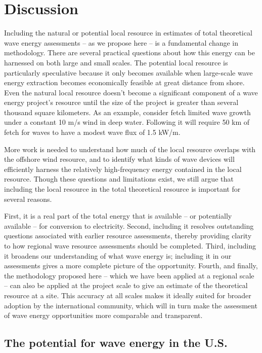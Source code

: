 \section{Discussion} \label{sec:discussion}

Including the natural or potential local resource in estimates of total theoretical wave energy assessments -- as we propose here -- is a fundamental change in methodology. There are several practical questions about how this energy can be harnessed on both large and small scales. 
The potential local resource is particularly speculative because it only becomes available when large-scale wave energy extraction becomes economically feasible at great distance from shore. Even the natural local resource doesn't become a significant component of a wave energy project's resource until the size of the project is greater than several thousand square kilometers. As an example, consider fetch limited wave growth under a constant 10 m/s wind in deep water. Following \citet{donelan1980similarity} it will require 50 km of fetch for waves to have a modest wave flux of 1.5 kW/m. 

More work is needed to understand how much of the local resource overlaps with the offshore wind resource, and to identify what kinds of wave devices will efficiently harness the relatively high-frequency energy contained in the local resource. Though these questions and limitations exist, we still argue that including the local resource in the total theoretical resource is important for several reasons.

First, it is a real part of the total energy that is available -- or potentially available -- for conversion to electricity. Second, including it resolves outstanding questions associated with earlier resource assessments, thereby providing clarity to how regional wave resource assessments should be completed.  Third, including it broadens our understanding of what wave energy is; including it in our assessments gives a more complete picture of the opportunity. Fourth, and finally, the methodology proposed here -- which we have been applied at a regional scale -- can also be applied at the project scale to give an estimate of the theoretical resource at a site. This accuracy at all scales makes it ideally suited for broader adoption by the international community, which will in turn make the assessment of wave energy opportunities more comparable and transparent.

\subsection{The potential for wave energy in the U.S.}

